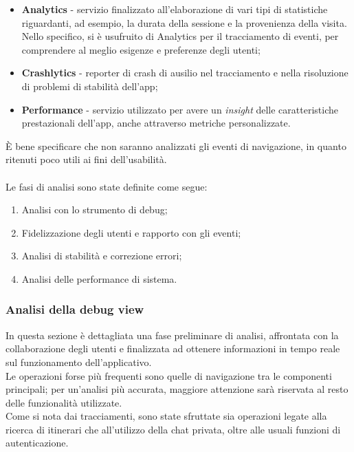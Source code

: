 \documentclass{natourDoc}
\begin{document}
\begin{itemize}
	\item \textbf{Analytics} -  servizio finalizzato all'elaborazione di vari tipi di statistiche riguardanti, ad esempio, la durata della sessione e la provenienza della visita. 
								Nello specifico, si è usufruito di Analytics per il tracciamento di eventi, per comprendere al meglio esigenze e preferenze degli utenti;
	\item \textbf{Crashlytics} - reporter di crash di ausilio nel tracciamento e nella risoluzione di problemi di stabilità dell'app; 
	\item \textbf{Performance} - servizio utilizzato per avere un \textit{insight} delle caratteristiche prestazionali dell'app, anche attraverso metriche personalizzate.
\end{itemize}

È bene specificare che non saranno analizzati gli eventi di navigazione,
in quanto ritenuti poco utili ai fini dell'usabilità. \\\\
Le fasi di analisi sono state definite come segue:
\begin{enumerate}
	\item Analisi con lo strumento di debug;
	\item Fidelizzazione degli utenti e rapporto con gli eventi;
	\item Analisi di stabilità e correzione errori;
	\item Analisi delle performance di sistema.
\end{enumerate}

\newpage

\subsubsection{Analisi della debug view}
In questa sezione è dettagliata una fase preliminare di analisi, 
affrontata con la collaborazione degli utenti e finalizzata ad ottenere informazioni 
in tempo reale sul funzionamento dell'applicativo. \\
Le operazioni forse più frequenti sono quelle di navigazione tra le componenti principali; per un'analisi più accurata, 
maggiore attenzione sarà riservata al resto delle funzionalità utilizzate. \\
Come si nota dai tracciamenti, sono state sfruttate sia operazioni legate alla ricerca di itinerari che all'utilizzo 
della chat privata, oltre alle usuali funzioni di autenticazione.
\end{document}

